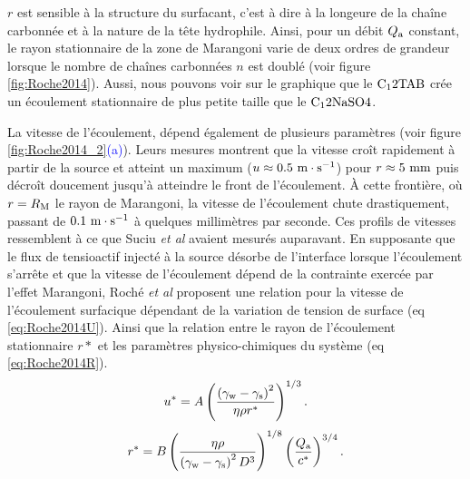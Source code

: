 $r$ est sensible à la structure du surfacant, c'est à dire à la longeure de la chaîne carbonnée et à la nature de la tête hydrophile. Ainsi, pour un débit $Q_{\rm a}$ constant, le rayon  stationnaire de la zone de Marangoni varie de deux ordres de grandeur lorsque le nombre de chaînes carbonnées $n$ est doublé (voir figure \ref{fig:Roche2014}). Aussi, nous pouvons voir sur le graphique que le $\rm C_12TAB$ crée un écoulement stationnaire de plus petite taille que le $\rm C_12NaSO4$.

La vitesse de l'écoulement, dépend également de plusieurs paramètres (voir figure \ref{fig:Roche2014_2}\textcolor{blue}{(a)}). Leurs mesures montrent que la vitesse croît rapidement à partir de la source et atteint un maximum ($u\approx 0.5~\rm m\cdot s^{-1}$) pour $r\approx 5~\rm mm$ puis décroît doucement jusqu'à atteindre le front de l'écoulement. À cette frontière, où $r=R_{\rm M}$ le rayon de Marangoni, la vitesse de l'écoulement chute drastiquement, passant de $0.1~\rm m\cdot s^{-1}$ à quelques millimètres par seconde. Ces profils de vitesses ressemblent à ce que Suciu \textit{et al} \cite{Suciu1967,Suciu1969} avaient mesurés auparavant. En supposante que le flux de tensioactif injecté à la source désorbe de l'interface lorsque l'écoulement s'arrête  et que la vitesse de l'écoulement dépend de la contrainte exercée par l'effet Marangoni, Roché \textit{et al} proposent une relation pour la vitesse de l'écoulement surfacique dépendant de la variation de tension de surface (eq \eqref{eq:Roche2014U}). Ainsi que la relation entre le rayon de l'écoulement stationnaire $r*$ et les paramètres physico-chimiques du système (eq \eqref{eq:Roche2014R}).
\begin{equation}
  u^{*} = A\left(\dfrac{\left(\gamma_{\rm w}-\gamma_{\rm s}\right)^2}{\eta\rho r^{*}}\right)^{1/3}\label{eq:Roche2014U}.
\end{equation}
\begin{equation}
  r^{*}=B\left(\dfrac{\eta\rho}{\left(\gamma_{\rm w}-\gamma_{\rm s}\right)^2D^3}\right)^{1/8}\left(\dfrac{Q_{\rm a}}{c^{*}}\right)^{3/4}\label{eq:Roche2014R}.
\end{equation}
